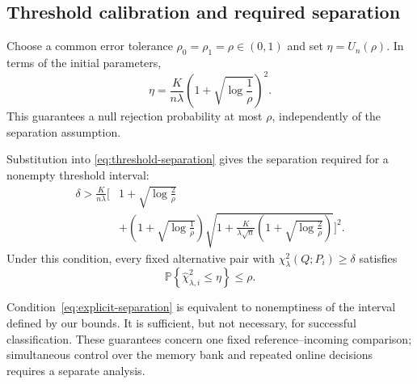\documentclass[11pt,a4paper]{article}
\newcommand{\Prob}{\mathbb P}
\begin{document}
\subsection{Threshold calibration and required separation}

Choose a common error tolerance
$\rho_0=\rho_1=\rho\in(0,1)$ and set
$\eta=U_n(\rho)$. In terms of the initial parameters,
\begin{equation}\label{eq:explicit-threshold}
    \boxed{
    \eta
    =
    \frac{K}{n\lambda}
    \left(1+\sqrt{\log\frac1\rho}\right)^2.
    }
\end{equation}
This guarantees a null rejection probability at most
$\rho$, independently of the separation assumption.

Substitution into \eqref{eq:threshold-separation}
gives the separation required for a nonempty
threshold interval:
\begin{equation}\label{eq:explicit-separation}
\boxed{
\begin{aligned}
    \delta>
    \frac{K}{n\lambda}
    \Bigg[
        &1+\sqrt{\log\frac2\rho}\\
        &+
        \left(1+\sqrt{\log\frac1\rho}\right)
        \sqrt{
            1+\frac{K}{\lambda\sqrt n}
            \left(1+\sqrt{\log\frac2\rho}\right)
        }
    \Bigg]^2.
\end{aligned}
}
\end{equation}
Under this condition, every fixed alternative pair
with $\chi^2_\lambda(Q;P_i)\ge\delta$ satisfies
\[
    \Prob\left\{
        \widehat\chi^2_{\lambda,i}\le\eta
    \right\}\le\rho.
\]

Condition~\eqref{eq:explicit-separation} is equivalent
to nonemptiness of the interval defined by our bounds.
It is sufficient, but not necessary, for successful
classification. These guarantees concern one fixed
reference--incoming comparison; simultaneous control
over the memory bank and repeated online decisions
requires a separate analysis.
\end{document}

